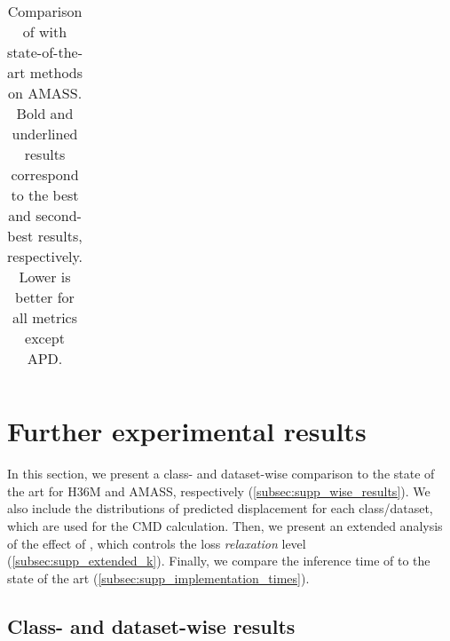 \documentclass[10pt,twocolumn,letterpaper]{article}
\begin{document}
\begin{table}[t!]
\begin{tabular}{lccccccc@{\hskip 2mm}}
 \bottomrule
    \end{tabular}
    \caption{Comparison of \modelname{} with state-of-the-art methods on AMASS. Bold and underlined results correspond to the best and second-
best results, respectively. Lower is better for all metrics except APD.}
    \label{tab:supp_sota_comparison_amass}
\end{table}
\setlength{\tabcolsep}{6pt}


\section{Further experimental results}
\label{sec:supp_exp_results}

In this section, we present a class- and dataset-wise comparison to the state of the art for H36M and AMASS, respectively (\autoref{subsec:supp_wise_results}). We also include the distributions of predicted displacement for each class/dataset, which are used for the CMD calculation. Then, we present an extended analysis of the effect of , which controls the loss \textit{relaxation} level (\autoref{subsec:supp_extended_k}).
Finally, we compare the inference time of \modelname{} to the state of the art (\autoref{subsec:supp_implementation_times}).




\subsection{Class- and dataset-wise results}
\label{subsec:supp_wise_results}
\end{document}
